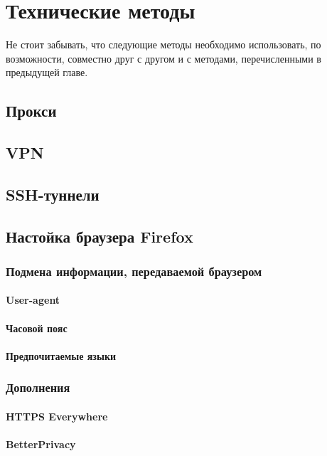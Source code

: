 \chapter{Технические методы}
\begin{important}
Не стоит забывать, что следующие методы необходимо использовать, по возможности, совместно друг с другом и с методами, перечисленными в предыдущей главе.
\end{important}
\section{Прокси}

\section{VPN}

\section{SSH-туннели}

\section{Настойка браузера Firefox}
\subsection{Подмена информации, передаваемой браузером}
\subsubsection{User-agent}
\subsubsection{Часовой пояс}
\subsubsection{Предпочитаемые языки}
\subsection{Дополнения}
\subsubsection{HTTPS Everywhere}
\subsubsection{BetterPrivacy}
